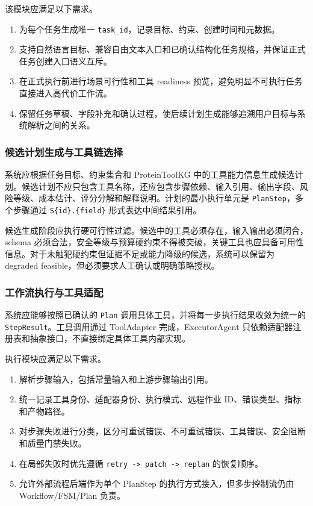 该模块应满足以下需求。

\begin{enumerate}
\def\labelenumi{\arabic{enumi}.}
\tightlist
\item
  为每个任务生成唯一
  \texttt{task\_id}，记录目标、约束、创建时间和元数据。
\item
  支持自然语言目标、兼容自由文本入口和已确认结构化任务规格，并保证正式任务创建入口语义互斥。
\item
  在正式执行前进行场景可行性和工具 readiness
  预览，避免明显不可执行任务直接进入高代价工作流。
\item
  保留任务草稿、字段补充和确认过程，使后续计划生成能够追溯用户目标与系统解析之间的关系。
\end{enumerate}

\subsubsection{候选计划生成与工具链选择}\label{ux5019ux9009ux8ba1ux5212ux751fux6210ux4e0eux5de5ux5177ux94feux9009ux62e9}

系统应根据任务目标、约束集合和 ProteinToolKG
中的工具能力信息生成候选计划。候选计划不应只包含工具名称，还应包含步骤依赖、输入引用、输出字段、风险等级、成本估计、评分分解和解释说明。计划的最小执行单元是
\texttt{PlanStep}，多个步骤通过 \texttt{S\{id\}.\{field\}}
形式表达中间结果引用。

候选生成阶段应执行硬可行性过滤。候选中的工具必须存在，输入输出必须闭合，schema
必须合法，安全等级与预算硬约束不得被突破，关键工具也应具备可用性信息。对于未触犯硬约束但证据不足或能力降级的候选，系统可以保留为
degraded feasible，但必须要求人工确认或明确策略授权。

\subsubsection{工作流执行与工具适配}\label{ux5de5ux4f5cux6d41ux6267ux884cux4e0eux5de5ux5177ux9002ux914d}

系统应能够按照已确认的 \texttt{Plan}
调用具体工具，并将每一步执行结果收敛为统一的
\texttt{StepResult}。工具调用通过 ToolAdapter 完成，ExecutorAgent
只依赖适配器注册表和抽象接口，不直接绑定具体工具内部实现。

执行模块应满足以下需求。

\begin{enumerate}
\def\labelenumi{\arabic{enumi}.}
\tightlist
\item
  解析步骤输入，包括常量输入和上游步骤输出引用。
\item
  统一记录工具身份、适配器身份、执行模式、远程作业
  ID、错误类型、指标和产物路径。
\item
  对步骤失败进行分类，区分可重试错误、不可重试错误、工具错误、安全阻断和质量门禁失败。
\item
  在局部失败时优先遵循
  \texttt{retry\ -\textgreater{}\ patch\ -\textgreater{}\ replan}
  的恢复顺序。
\item
  允许外部流程后端作为单个 PlanStep 的执行方式接入，但多步控制流仍由
  Workflow/FSM/Plan 负责。
\end{enumerate}

